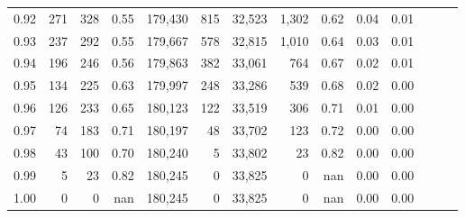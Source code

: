 \begin{tabular}{rrrrrrrrrrrrrr}
0.92 &    271 &  328 &  0.55 &  179,430 &      815 &  32,523 &   1,302 &  0.62 &  0.04 &      0.01 \\
0.93 &    237 &  292 &  0.55 &  179,667 &      578 &  32,815 &   1,010 &  0.64 &  0.03 &      0.01 \\
0.94 &    196 &  246 &  0.56 &  179,863 &      382 &  33,061 &     764 &  0.67 &  0.02 &      0.01 \\
0.95 &    134 &  225 &  0.63 &  179,997 &      248 &  33,286 &     539 &  0.68 &  0.02 &      0.00 \\
0.96 &    126 &  233 &  0.65 &  180,123 &      122 &  33,519 &     306 &  0.71 &  0.01 &      0.00 \\
0.97 &     74 &  183 &  0.71 &  180,197 &       48 &  33,702 &     123 &  0.72 &  0.00 &      0.00 \\
0.98 &     43 &  100 &  0.70 &  180,240 &        5 &  33,802 &      23 &  0.82 &  0.00 &      0.00 \\
0.99 &      5 &   23 &  0.82 &  180,245 &        0 &  33,825 &       0 &   nan &  0.00 &      0.00 \\
1.00 &      0 &    0 &   nan &  180,245 &        0 &  33,825 &       0 &   nan &  0.00 &      0.00 \\
\bottomrule
\end{tabular}
